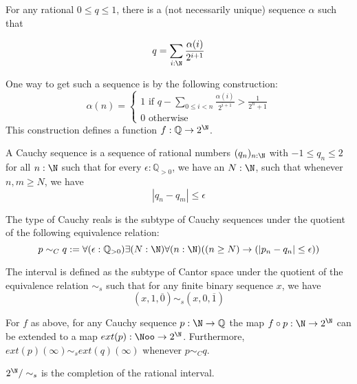 For any rational $0\leq q \leq 1$, there is a (not necessarily unique) sequence $\alpha$ such that 

\begin{equation}q = \sum_{i : \N} \frac{\alpha(i)}{2^{i+1}}\end{equation}

One way to get such a sequence is by the following construction:
\begin{equation}\alpha(n)  = \begin{cases}
  1 \text{ if } q - \sum_{0\leq i < n} \frac{\alpha(i)}{2^{i+1}} > \frac 1 {2 ^ n + 1} \\
0 \text{ otherwise } 
\end{cases}
\end{equation} 
This construction defines a function $f: \mathbb Q \to 2^\N$. 
\begin{definition}
  A Cauchy sequence is a sequence of rational numbers $(q_n)_{n: \N}$ with $-1 \leq q_n \leq 2$ 
  for all $n:\N$
  such that for every $\epsilon: \mathbb Q_{>0}$, we have an $N:\N$, 
  such that whenever $n,m \geq N$, we have 
\begin{equation}
  | q_n - q_m | \leq \epsilon
\end{equation} 
\end{definition}
\begin{definition}
  The type of Cauchy reals is the subtype of Cauchy sequences under the quotient of the following 
  equivalence relation:
\begin{equation}
  p \sim_C q : = \forall (\epsilon : \mathbb Q_{>0} )\exists ( N :\N) \forall (n : \N) ((n \geq N) \to 
  (| p_n - q_n| \leq  \epsilon))
\end{equation}
\end{definition}


\begin{definition}
  The interval is defined as the subtype of Cantor space under the quotient of the equivalence relation
  $\sim_s$ such that for any finite binary sequence $x$, we have
  \begin{equation}(x,1,\overline 0) \sim_s (x ,0, \overline 1)\end{equation}
\end{definition} 



\begin{proposition}
  For $f$ as above, for any Cauchy sequence $p: \N \to \mathbb Q$ 
  the map $f\circ p: \N \to 2^\N$ can be extended to a map 
  $ext(p) : \Noo \to 2^\N$. 
  Furthermore, $ext(p)(\infty) \sim_s ext(q)(\infty)$ whenever $p \sim_C q$. 
\end{proposition} 
\begin{corollary}
  $2^\N/\sim_s$ is the completion of the rational interval. 
\end{corollary}


